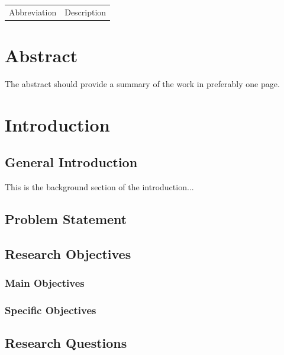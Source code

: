 \documentclass[a4paper, 12pt]{report}
\begin{document}
\begin{tabular}{ll}
Abbreviation & Description \\
\end{tabular}

\chapter*{Abstract}

The abstract should provide a summary of the work in preferably one page.

\tableofcontents
{}

\listoffigures
{}

\listoftables
{}

\chapter{Introduction}
\section{General Introduction}
This is the background section of the introduction...
\section{Problem Statement}

\section{Research Objectives}

\subsection{Main Objectives}

\subsection{Specific Objectives}

\section{Research Questions}
\end{document}
